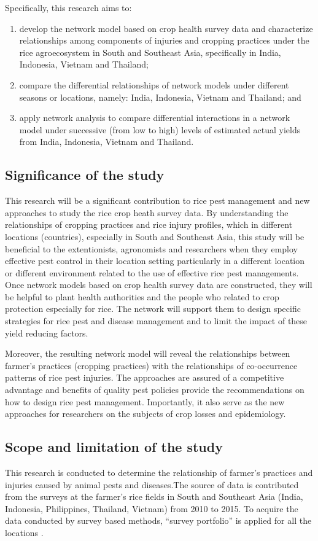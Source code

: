 Specifically, this research aims to:
\begin{enumerate}
\item develop the network model based on crop health survey data and characterize relationships among components of injuries and cropping practices under the rice agroecosystem in South and Southeast Asia, specifically in India, Indonesia, Vietnam and Thailand;
\item compare the differential relationships of network models under different seasons or locations, namely: India, Indonesia, Vietnam and Thailand; and
\item apply network analysis to compare differential interactions in a network model under successive (from low to high) levels of estimated actual yields from India, Indonesia, Vietnam and Thailand.
\end{enumerate}

\subsection{Significance of the study}

This research will be a significant contribution to rice pest management and  new approaches to study the rice crop heath survey data. By understanding the relationships of cropping practices and rice injury profiles, which in different locations (countries), especially in South and Southeast Asia, this study will be beneficial to the extentionists, agronomists and researchers when they employ effective pest control in their location setting particularly in a different location or different environment related to the use of effective rice pest managements. Once network models based on crop health survey data are constructed, they will be helpful to plant health authorities and the people who related to crop protection especially for rice. The network will support them to design specific strategies for rice pest and disease management and to limit the impact of these yield reducing factors.

Moreover, the resulting network model will reveal the relationships between farmer's practices (cropping practices) with the relationships of co-occurrence patterns of rice pest injuries. The approaches are assured of a competitive advantage and benefits of quality pest policies provide the recommendations on how to design rice pest management. Importantly, it also serve as the new approaches for researchers on the subjects of crop losses  and epidemiology.

\subsection{Scope and limitation of the study}

This research is conducted to determine the relationship of farmer's practices and injuries caused by animal pests and diseases.The source of data is contributed from the surveys at the farmer's rice fields in South and Southeast Asia (India, Indonesia, Philippines, Thailand, Vietnam) from 2010 to 2015. To acquire the data conducted by survey based methods, ``survey portfolio'' is applied for all the locations \citep{Savary_2009_Survey}.
